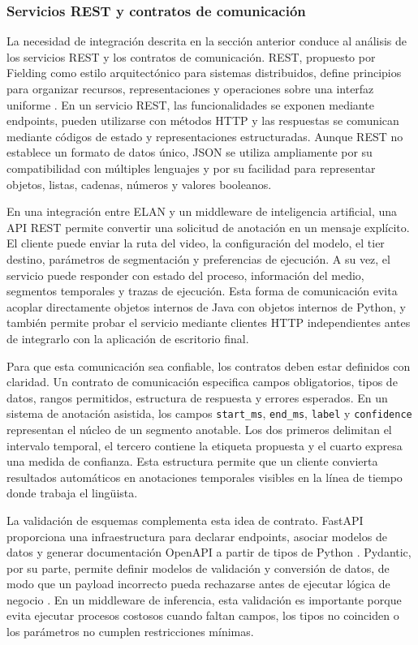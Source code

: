 \subsubsection{Servicios REST y contratos de comunicación}

La necesidad de integración descrita en la sección anterior conduce al análisis de los servicios REST y los contratos de comunicación. REST, propuesto por Fielding como estilo arquitectónico para sistemas distribuidos, define principios para organizar recursos, representaciones y operaciones sobre una interfaz uniforme \cite{fielding2000rest}. En un servicio REST, las funcionalidades se exponen mediante endpoints, pueden utilizarse con métodos HTTP y las respuestas se comunican mediante códigos de estado y representaciones estructuradas. Aunque REST no establece un formato de datos único, JSON se utiliza ampliamente por su compatibilidad con múltiples lenguajes y por su facilidad para representar objetos, listas, cadenas, números y valores booleanos.

En una integración entre ELAN y un middleware de inteligencia artificial, una API REST permite convertir una solicitud de anotación en un mensaje explícito. El cliente puede enviar la ruta del video, la configuración del modelo, el tier destino, parámetros de segmentación y preferencias de ejecución. A su vez, el servicio puede responder con estado del proceso, información del medio, segmentos temporales y trazas de ejecución. Esta forma de comunicación evita acoplar directamente objetos internos de Java con objetos internos de Python, y también permite probar el servicio mediante clientes HTTP independientes antes de integrarlo con la aplicación de escritorio final.

Para que esta comunicación sea confiable, los contratos deben estar definidos con claridad. Un contrato de comunicación especifica campos obligatorios, tipos de datos, rangos permitidos, estructura de respuesta y errores esperados. En un sistema de anotación asistida, los campos \texttt{start\_ms}, \texttt{end\_ms}, \texttt{label} y \texttt{confidence} representan el núcleo de un segmento anotable. Los dos primeros delimitan el intervalo temporal, el tercero contiene la etiqueta propuesta y el cuarto expresa una medida de confianza. Esta estructura permite que un cliente convierta resultados automáticos en anotaciones temporales visibles en la línea de tiempo donde trabaja el lingüista.

La validación de esquemas complementa esta idea de contrato. FastAPI proporciona una infraestructura para declarar endpoints, asociar modelos de datos y generar documentación OpenAPI a partir de tipos de Python \cite{fastapi2026features}. Pydantic, por su parte, permite definir modelos de validación y conversión de datos, de modo que un payload incorrecto pueda rechazarse antes de ejecutar lógica de negocio \cite{pydantic2026models}. En un middleware de inferencia, esta validación es importante porque evita ejecutar procesos costosos cuando faltan campos, los tipos no coinciden o los parámetros no cumplen restricciones mínimas.

